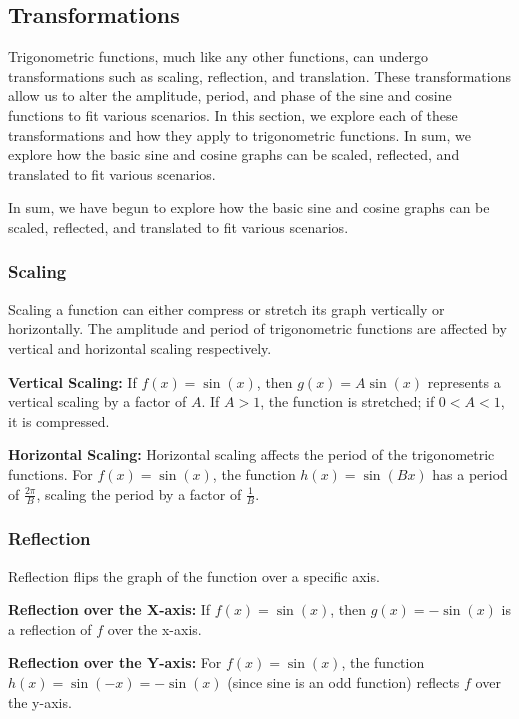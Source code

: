 \documentclass[a4paper,12pt]{book}
\begin{document}
\subsection{Transformations}
\label{subsec:transformations}

Trigonometric functions, much like any other functions, can undergo transformations such as scaling, reflection, and translation. These transformations allow us to alter the amplitude, period, and phase of the sine and cosine functions to fit various scenarios. In this section, we explore each of these transformations and how they apply to trigonometric functions. In sum, we explore how the basic sine and cosine graphs can be scaled, reflected, and translated to fit various scenarios.

In sum, we have begun to explore how the basic sine and cosine graphs can be scaled, reflected, and translated to fit various scenarios.

\subsubsection{Scaling}
Scaling a function can either compress or stretch its graph vertically or horizontally. The amplitude and period of trigonometric functions are affected by vertical and horizontal scaling respectively.

\textbf{Vertical Scaling:} If \( f(x) = \sin(x) \), then \( g(x) = A\sin(x) \) represents a vertical scaling by a factor of \( A \). If \( A > 1 \), the function is stretched; if \( 0 < A < 1 \), it is compressed.

\textbf{Horizontal Scaling:} Horizontal scaling affects the period of the trigonometric functions. For \( f(x) = \sin(x) \), the function \( h(x) = \sin(Bx) \) has a period of \( \frac{2\pi}{B} \), scaling the period by a factor of \( \frac{1}{B} \).

\subsubsection{Reflection}
Reflection flips the graph of the function over a specific axis. 

\textbf{Reflection over the X-axis:} If \( f(x) = \sin(x) \), then \( g(x) = -\sin(x) \) is a reflection of \( f \) over the x-axis.

\textbf{Reflection over the Y-axis:} For \( f(x) = \sin(x) \), the function \( h(x) = \sin(-x) = -\sin(x) \) (since sine is an odd function) reflects \( f \) over the y-axis.
\end{document}
